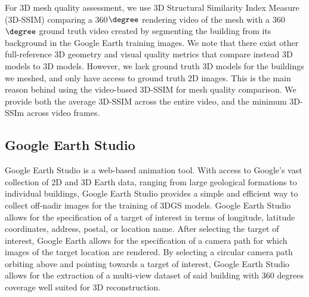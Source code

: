 For 3D mesh quality assessment, we use 3D Structural Similarity Index Measure (3D-SSIM) \cite{3dssim} comparing a 360$\degree$ rendering video of the mesh with a 360$\degree$ ground truth video created by segmenting the building from its background in the Google Earth training images. We note that there exist other full-reference 3D geometry and visual quality metrics that compare instead 3D models to 3D models. However, we lack ground truth 3D models for the buildings we meshed, and only have access to ground truth 2D images. This is the main reason behind using the video-based 3D-SSIM for mesh quality comparison. We provide both the average 3D-SSIM across the entire video, and the minimum 3D-SSIm across video frames. 

\subsection{Google Earth Studio}
Google Earth Studio \cite{google_earth_studio} \cite{gao_3dgs} is a web-based animation tool. With access to Google's vast collection of 2D and 3D Earth data, ranging from large geological formations to individual buildings, Google Earth Studio provides a simple and efficient way to collect off-nadir images for the training of 3DGS models. Google Earth Studio allows for the specification of a target of interest in terms of longitude, latitude coordinates, address, postal, or location name. After selecting the target of interest, Google Earth allows for the specification of a camera path for which images of the target location are rendered. By selecting a circular camera path orbiting above and pointing towards a target of interest, Google Earth Studio allows for the extraction of a multi-view dataset of said building with 360 degrees coverage well suited for 3D reconstruction. 
